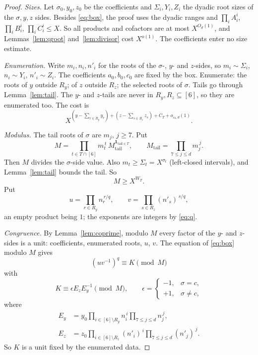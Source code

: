 \documentclass{amsart}
\numberwithin{equation}{section}
\numberwithin{table}{section}
\begin{document}
\begin{proof}
\emph{Sizes.} Let $\sigma_0,y_0,z_0$ be the coefficients and $\Sigma_i,Y_i,Z_i$ the dyadic
root sizes of the $\sigma,y,z$ sides. Besides \eqref{eq:box}, the proof uses
the dyadic ranges and $\prod_iA_i^i$, $\prod_iB_i^i$, $\prod_iC_i^i\le X$. So all
products and cofactors are at most $X^{O_d(1)}$, and
Lemmas~\ref{lem:qroot} and~\ref{lem:divisor} cost $X^{o(1)}$. The
coefficients enter no size estimate.

\emph{Enumeration.} Write $m_i,n_i,n'_i$ for the roots of the $\sigma$-, $y$-
and $z$-sides, so $m_i\sim\Sigma_i$, $n_i\sim Y_i$, $n'_i\sim Z_i$. The
coefficients $a_0,b_0,c_0$ are fixed by the box.
Enumerate: the roots of
$y$ outside $R_y$; of $z$ outside $R_z$; the selected roots of $\sigma$. Tails
go through Lemma~\ref{lem:tail}. The $y$- and $z$-tails are never in
$R_y,R_z\subseteq[6]$, so they are enumerated too. The cost is
\begin{equation}\label{eq:enum}
 X^{(y-\sum_{r\in R_y}y_r)+(z-\sum_{s\in R_z}z_s)+C_T+o_{\varepsilon_0,d}(1)} .
\end{equation}

\emph{Modulus.} The tail roots of $\sigma$ are $m_j$, $j\ge7$. Put
\begin{equation}\label{eq:M}
 M=\prod_{t\in T\cap[6]}m_t^{\,t}\,
 M_{\mathrm{tail}}^{\mathbf 1_{\mathrm{tail}\in T}},
 \qquad M_{\mathrm{tail}}=\prod_{7\le j\le d}m_j^{\,j}.
\end{equation}
Then $M$ divides the $\sigma$-side value. Also $m_t\ge\Sigma_t=X^{\sigma_t}$
(left-closed intervals), and Lemma~\ref{lem:tail} bounds the tail. So
\begin{equation}\label{eq:Msize}
 M\ge X^{W_T} .
\end{equation}
Put
\begin{equation}\label{eq:uv}
 u=\prod_{r\in R_y}n_r^{\,r/q},
 \qquad
 v=\prod_{s\in R_z}(n'_s)^{\,s/q},
\end{equation}
an empty product being $1$; the exponents are integers by \eqref{eq:q}.

\emph{Congruence.} By Lemma~\ref{lem:coprime}, modulo $M$ every factor of the
$y$- and $z$-sides is a unit: coefficients, enumerated roots, $u$, $v$. The equation of
\eqref{eq:box} modulo $M$ gives
\begin{equation}\label{eq:congr}
 (uv^{-1})^{q}\equiv K\pmod M
\end{equation}
with
\begin{equation}\label{eq:Ksign}
 K\equiv\epsilon E_zE_y^{-1}\pmod M,\qquad
 \epsilon=\begin{cases}-1,&\sigma=c,\\+1,&\sigma\ne c,\end{cases}
\end{equation}
where
\[
\begin{aligned}
E_y&=y_0\prod_{i\in[6]\setminus R_y}n_i^{\,i}
 \prod_{7\le j\le d}n_j^{\,j},\\
E_z&=z_0\prod_{i\in[6]\setminus R_z}(n'_i)^{\,i}
 \prod_{7\le j\le d}(n'_j)^{\,j}.
\end{aligned}
\]
So $K$ is a unit fixed by the enumerated data.


\end{proof}
\end{document}
